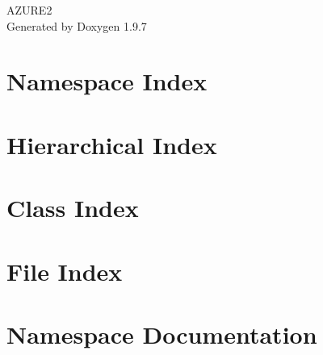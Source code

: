 \documentclass[twoside]{book}
\newcommand{\+}{\discretionary{\mbox{\scriptsize$\hookleftarrow$}}{}{}}
\newcommand{\clearemptydoublepage}{%
    \newpage{\pagestyle{empty}\cleardoublepage}%
  }
\begin{document}
  \raggedbottom
    \hypersetup{pageanchor=false,
                bookmarksnumbered=true,
                pdfencoding=unicode
               }
  \begin{titlepage}
  \vspace*{7cm}
  \begin{center}%
  {\Large AZURE2}\\
  \vspace*{1cm}
  {\large Generated by Doxygen 1.9.7}\\
  \end{center}
  \end{titlepage}
  \clearemptydoublepage
  \tableofcontents
  \clearemptydoublepage
  \hypersetup{pageanchor=true}

\chapter{Namespace Index}

\chapter{Hierarchical Index}

\chapter{Class Index}

\chapter{File Index}

\chapter{Namespace Documentation}


\end{document}
